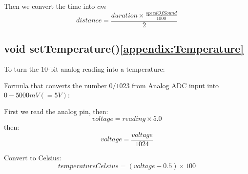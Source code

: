 Then we convert the time into $cm$ 
\begin{equation}
distance = \frac{duration \times \frac{speedOfSound}{1000}}{2} 
\end{equation}

\subsection{void setTemperature()\ref{appendix:Temperature}}
To turn the 10-bit analog reading into a temperature:

Formula that converts the number $0/1023$ from Analog ADC input into $0-5000mV(=5V)$:

First we read the analog pin, then:
\begin{equation}
voltage = reading \times 5.0
\end{equation}
then:
\begin{equation}
voltage = \frac{voltage}{1024}
\end{equation}

Convert to Celsius:
\begin{equation}
temperatureCelsius = (voltage - 0.5) \times 100
\end{equation}

